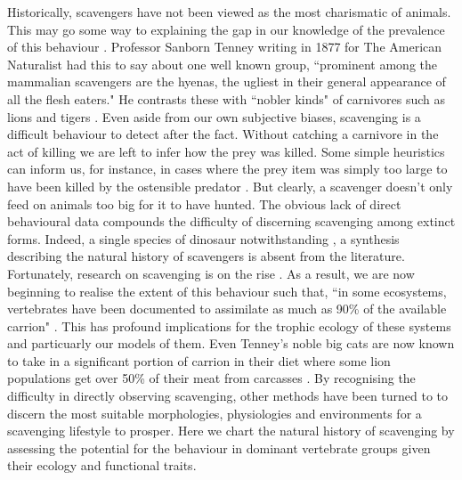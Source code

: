 \documentclass[a4paper,12pt]{article}
\begin{document}
Historically, scavengers have not been viewed as the most charismatic of animals.
This may go some way to explaining the gap in our knowledge of the prevalence of this behaviour \citep{devault2003scavenging}.
Professor Sanborn Tenney writing in 1877 for The American Naturalist had this to say about one well known group, ``prominent among the mammalian scavengers are the hyenas, the ugliest in their general appearance of all the flesh eaters."
He contrasts these with ``nobler kinds" of carnivores such as lions and tigers \citep{tenney1877few}.
Even aside from our own subjective biases, scavenging is a difficult behaviour to detect after the fact.
Without catching a carnivore in the act of killing we are left to infer how the prey was killed.
Some simple heuristics can inform us, for instance, in cases where the prey item was simply too large to have been killed by the ostensible predator \citep{pobiner2008paleoecological}.
But clearly, a scavenger doesn’t only feed on animals too big for it to have hunted.
The obvious lack of direct behavioural data compounds the difficulty of discerning scavenging among extinct forms.
Indeed, a single species of dinosaur notwithstanding \citep{carbone2011intra}, a synthesis describing the natural history of scavengers is absent from the literature.
Fortunately, research on scavenging is on the rise \citep{manga2006vulture}.
As a result, we are now beginning to realise the extent of this behaviour such that, ``in some ecosystems, vertebrates have been documented to assimilate as much as 90\% of the available carrion" \citep{beasley2015vertebrates}.
This has profound implications for the trophic ecology of these systems and particuarly our models of them.
Even Tenney’s noble big cats are now known to take in a significant portion of carrion in their diet where some lion populations get over 50\% of their meat from carcasses \citep{jones2015african}.
By recognising the difficulty in directly observing scavenging, other methods have been turned to to discern the most suitable morphologies, physiologies and environments for a scavenging lifestyle to prosper.
Here we chart the natural history of scavenging by assessing the potential for the behaviour in dominant vertebrate groups given their ecology and functional traits.
\end{document}
